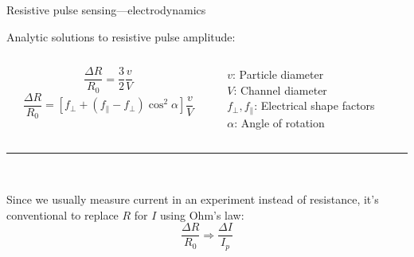\begin{frame}[c]{Resistive pulse sensing---electrodynamics}



		Analytic solutions to resistive pulse amplitude:
		\vspace{.1in}
		
		\begin{columns}[t]
			\begin{column}[T]{2.5in}
				\begin{equation} \tag{Sphere through cylinder}
					\frac{\Delta R}{R_{0}}=\frac{3}{2}\frac{v}{V}
				\end{equation}
				\vspace{-.1in}				
				\begin{equation} \tag{Ellipsoid through cylinder}
					\frac{\Delta R}{R_{0}}=\left[f_{\perp}+\left(f_{\parallel}-f_{\perp}\right)\cos^{2}\alpha\right]\frac{v}{V}
				\end{equation}
			\end{column}
			\hfill
			\begin{column}[T]{1.5in}
				$v$: Particle diameter \\
				\vspace{.0675in}
				$V$: Channel diameter \\
				\vspace{.0675in}
				$f_{\perp}, f_{\parallel}$: Electrical shape factors \\
				\vspace{.0675in}
				$\alpha$: Angle of rotation
			\end{column}

		\end{columns}

		
		\vspace{0.1in}
		{\centering
			\noindent\rule{4.5in}{1pt} \\
			\par
		}

		
		Since we usually measure current in an experiment instead of resistance, it's conventional to replace $R$ for $I$ using Ohm's law:
		\[ \frac{\Delta R}{R_{0}}\Rightarrow\frac{\Delta I}{I_{p}} \]
\end{frame}







